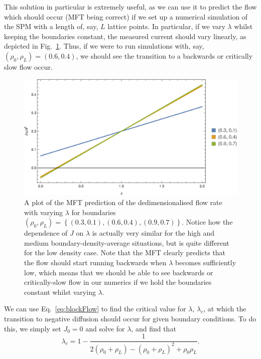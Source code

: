 This solution in particular is extremely useful, as we can use it to predict the flow which should occur (MFT being correct) if we set up a numerical simulation of the SPM with a length of, say, $L$ lattice points. In particular,
if we vary $\lambda$ whilst keeping the boundaries constant, the measured current should vary linearly, as depicted in Fig.~\ref{fig:lambdaScanPlots}. Thus, if we were to run simulations with, say,
$(\rho_0, \rho_L) = (0.6, 0.4)$, we should see the transition to a backwards or critically slow flow occur.
\begin{figure}[h!]
 \caption[The variation of flow rate with respect to $\lambda$ in the MFT, with fixed boundary densities.]{\label{fig:lambdaScanPlots} A plot of the MFT prediction of the dedimensionalised flow rate with varying $\lambda$ for boundaries $(\rho_0, \rho_L) = \left\lbrace (0.3, 0.1), (0.6, 0.4), (0.9, 0.7) \right\rbrace$.
 Notice how the dependence of $J$ on $\lambda$ is actually very similar for the high and medium boundary-density-average situations, but is quite different for the low density case. Note that the MFT clearly predicts
 that the flow should start running backwards when $\lambda$ becomes sufficiently low, which means that we should be able to see backwards or critically-slow flow in our numerics if we hold the boundaries constant
 whilst varying $\lambda$.}
 \includegraphics[width=0.99\linewidth]{analytics/images/lambdaFlucPlots}
\end{figure}
We can use Eq.~\ref{eq:blockFlow} to find the critical value for $\lambda$, $\lambda_c$, at which the transition to negative diffusion should occur for given boundary conditions.
To do this, we simply set $J_0 = 0$ and solve for $\lambda$, and find that 
\begin{equation}
\label{eq:critLambda}
 \lambda_c = 1 - \frac{1}{2(\rho_0 + \rho_L) - (\rho_0 + \rho_L)^2 + \rho_0 \rho_L} .
\end{equation}
